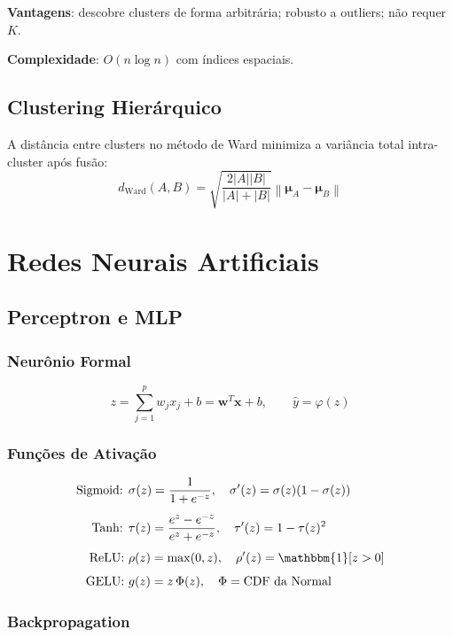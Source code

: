 \documentclass[12pt,a4paper,twoside]{book}
\theoremstyle{definition}
\theoremstyle{remark}
\newcommand{\bx}{\bm{x}}
\newcommand{\bw}{\bm{w}}
\newcommand{\norm}[1]{\left\|#1\right\|}
\begin{document}
\textbf{Vantagens}: descobre clusters de forma arbitrária; robusto a outliers; não requer $K$.

\textbf{Complexidade}: $O(n \log n)$ com índices espaciais.

\section{Clustering Hierárquico}

A distância entre clusters no método de Ward minimiza a variância total intra-cluster após fusão:
\[
d_{\mathrm{Ward}}(A, B) = \sqrt{\frac{2|A||B|}{|A|+|B|}} \norm{\bm{\mu}_A - \bm{\mu}_B}
\]

\chapter{Redes Neurais Artificiais}

\section{Perceptron e MLP}

\subsection{Neurônio Formal}

\[
z = \sum_{j=1}^p w_j x_j + b = \bw^T\bx + b, \qquad \hat{y} = \varphi(z)
\]

\subsection{Funções de Ativação}

\begin{align}
\text{Sigmoid: } &\sigma(z) = \frac{1}{1+e^{-z}}, \quad \sigma'(z) = \sigma(z)(1-\sigma(z)) \label{eq:sigmoid}\\[4pt]
\text{Tanh: } &\tau(z) = \frac{e^z - e^{-z}}{e^z + e^{-z}}, \quad \tau'(z) = 1 - \tau(z)^2 \\[4pt]
\text{ReLU: } &\rho(z) = \max(0,z), \quad \rho'(z) = \mathbbm{1}[z>0] \\[4pt]
\text{GELU: } &g(z) = z\,\Phi(z), \quad \Phi = \text{CDF da Normal}
\end{align}

\subsection{Backpropagation}
\end{document}
